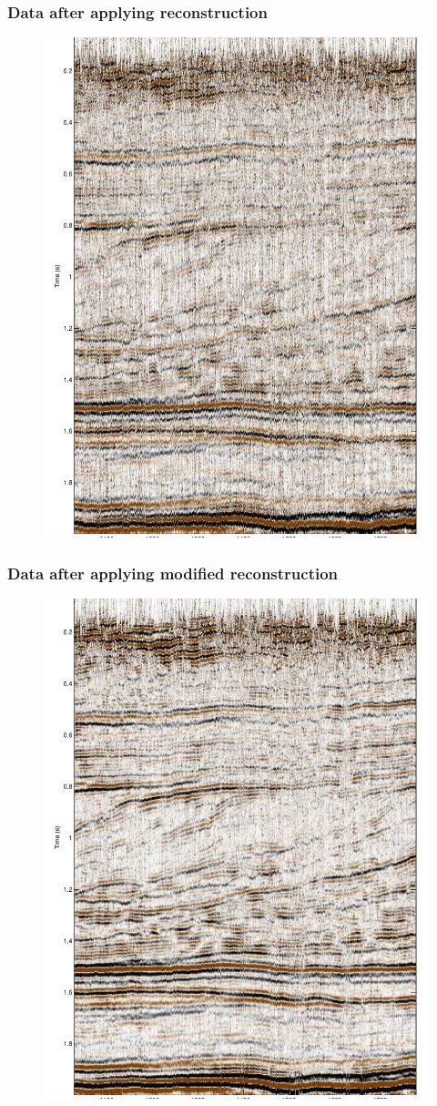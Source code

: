 \begin{frame} \frametitle{Data after applying reconstruction\\}
\begin{figure}[t]
\centering
\includegraphics[width=1\textwidth,height=0.5\textwidth,keepaspectratio=false]{syn5d/Fig/image_d_stat_p.pdf}
\end{figure}
\end{frame}

\begin{frame} \frametitle{Data after applying modified reconstruction}
\begin{figure}[t]
\centering
\includegraphics[width=1\textwidth,height=0.5\textwidth,keepaspectratio=false]{syn5d/Fig/image_d_stat_pws.pdf}
\end{figure}
\end{frame}




